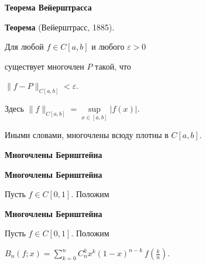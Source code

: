 \documentclass[11pt]{article}
\begin{document}
\begin{center}
{\color{notaeYELLOW}\bfseries\fontsize{44}{52}\selectfont Теорема Вейерштрасса}
\end{center}
\vspace*{\fill}
\begin{center}
\fontsize{36}{43}\selectfont
\textbf{Теорема} (Вейерштрасс, 1885).\par\vspace{0.4in}
Для любой $f \in C[a,b]$ и любого $\varepsilon>0$\par\vspace{0.4in}
существует многочлен $P$ такой, что\par\vspace{0.4in}
$\|f - P\|_{C[a,b]} < \varepsilon.$\par\vspace{0.4in}
Здесь $\|f\|_{C[a,b]}=\sup\limits_{x\in[a,b]}|f(x)|$.\par\vspace{0.4in}
Иными словами, многочлены всюду плотны в $C[a,b]$.\par\vspace{0.4in}
\end{center}
\vspace*{\fill}

\newpage

\begin{center}
{\color{notaeYELLOW}\bfseries\fontsize{44}{52}\selectfont Многочлены Бернштейна}
\end{center}
\vspace*{\fill}
\begin{center}
\fontsize{36}{43}\selectfont
\end{center}
\vspace*{\fill}

\newpage

\begin{center}
{\color{notaeYELLOW}\bfseries\fontsize{44}{52}\selectfont Многочлены Бернштейна}
\end{center}
\vspace*{\fill}
\begin{center}
\fontsize{36}{43}\selectfont
Пусть $f \in C[0,1]$. Положим\par\vspace{0.4in}
\end{center}
\vspace*{\fill}

\newpage

\begin{center}
{\color{notaeYELLOW}\bfseries\fontsize{44}{52}\selectfont Многочлены Бернштейна}
\end{center}
\vspace*{\fill}
\begin{center}
\fontsize{36}{43}\selectfont
Пусть $f \in C[0,1]$. Положим\par\vspace{0.4in}
$B_n(f;x) = \sum\limits_{k=0}^{n}  C_n^k x^k (1-x)^{n-k}\ f\!\left(\frac{k}{n}\right).$\par\vspace{0.4in}
\end{center}
\vspace*{\fill}
\end{document}
